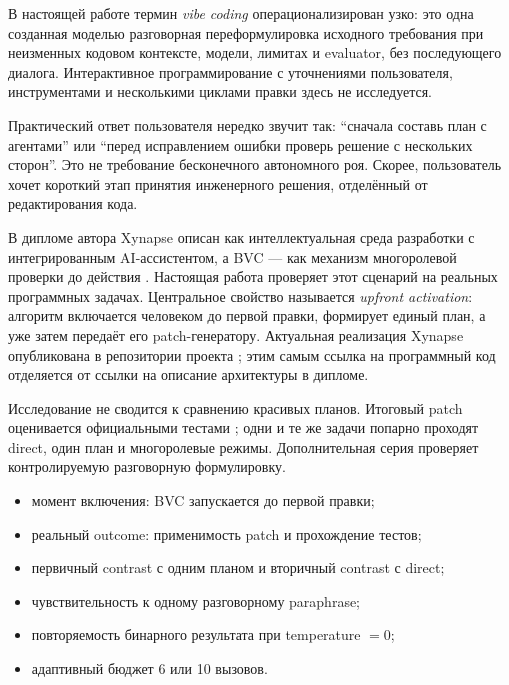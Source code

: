 \documentclass[11pt]{article}
\begin{document}
В настоящей работе термин \emph{vibe coding} операционализирован узко: это
одна созданная моделью разговорная переформулировка исходного требования при
неизменных кодовом контексте, модели, лимитах и evaluator, без последующего
диалога. Интерактивное программирование с уточнениями пользователя,
инструментами и несколькими циклами правки здесь не исследуется.

Практический ответ пользователя нередко звучит так: \enquote{сначала составь
план с агентами} или \enquote{перед исправлением ошибки проверь решение с
нескольких сторон}. Это не требование бесконечного автономного роя. Скорее,
пользователь хочет короткий этап принятия инженерного решения, отделённый от
редактирования кода.

В дипломе автора Xynapse описан как интеллектуальная среда разработки с
интегрированным AI-ассистентом, а BVC --- как механизм многоролевой проверки
до действия \cite{khalilov2026}. Настоящая работа проверяет этот сценарий на
реальных программных задачах. Центральное свойство называется
\emph{upfront activation}: алгоритм включается человеком до первой правки,
формирует единый план, а уже затем передаёт его patch-генератору. Актуальная
реализация Xynapse опубликована в репозитории проекта \cite{xynapse2026}; этим
самым ссылка на программный код отделяется от ссылки на описание архитектуры в
дипломе.

Исследование не сводится к сравнению красивых планов. Итоговый patch
оценивается официальными тестами \dataset{} \cite{jimenez2024swebench};
одни и те же задачи попарно проходят direct, один план и многоролевые режимы.
Дополнительная серия проверяет контролируемую разговорную формулировку.

\begin{resultbox}
\begin{itemize}
  \item момент включения: BVC запускается до первой правки;
  \item реальный outcome: применимость patch и прохождение тестов;
  \item первичный contrast с одним планом и вторичный contrast с direct;
  \item чувствительность к одному разговорному paraphrase;
  \item повторяемость бинарного результата при temperature \(=0\);
  \item адаптивный бюджет 6 или 10 вызовов.
\end{itemize}
\end{resultbox}
\end{document}
